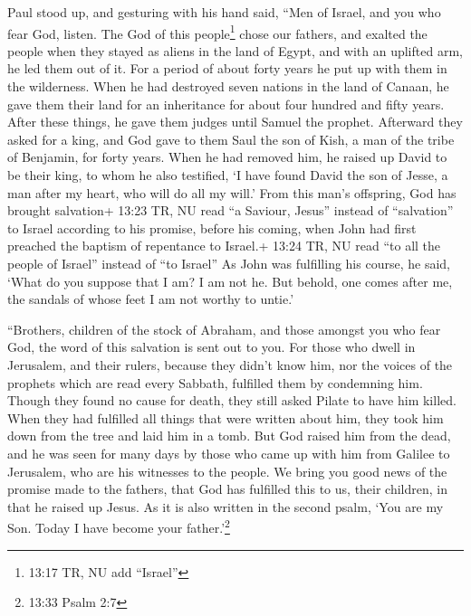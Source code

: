  Paul stood up, and gesturing with his hand said, ``Men of
Israel, and you who fear God, listen.  The God of this
people\footnote{13:17 TR, NU add ``Israel''} chose our fathers, and
exalted the people when they stayed as aliens in the land of Egypt, and
with an uplifted arm, he led them out of it.  For a period
of about forty years he put up with them in the wilderness.
 When he had destroyed seven nations in the land of Canaan,
he gave them their land for an inheritance for about four hundred and
fifty years.  After these things, he gave them judges until
Samuel the prophet.  Afterward they asked for a king, and
God gave to them Saul the son of Kish, a man of the tribe of Benjamin,
for forty years.  When he had removed him, he raised up
David to be their king, to whom he also testified, `I have found David
the son of Jesse, a man after my heart, who will do all my will.'
 From this man's offspring, God has brought salvation+
13:23 TR, NU read ``a Saviour, Jesus'' instead of ``salvation'' to
Israel according to his promise,  before his coming, when
John had first preached the baptism of repentance to Israel.+ 13:24 TR,
NU read ``to all the people of Israel'' instead of ``to Israel''
 As John was fulfilling his course, he said, `What do you
suppose that I am? I am not he. But behold, one comes after me, the
sandals of whose feet I am not worthy to untie.'

 ``Brothers, children of the stock of Abraham, and those
amongst you who fear God, the word of this salvation is sent out to you.
 For those who dwell in Jerusalem, and their rulers,
because they didn't know him, nor the voices of the prophets which are
read every Sabbath, fulfilled them by condemning him. 
Though they found no cause for death, they still asked Pilate to have
him killed.  When they had fulfilled all things that were
written about him, they took him down from the tree and laid him in a
tomb.  But God raised him from the dead,  and
he was seen for many days by those who came up with him from Galilee to
Jerusalem, who are his witnesses to the people.  We bring
you good news of the promise made to the fathers,  that God
has fulfilled this to us, their children, in that he raised up Jesus. As
it is also written in the second psalm, `You are my Son. Today I have
become your father.'\footnote{13:33 Psalm 2:7}


